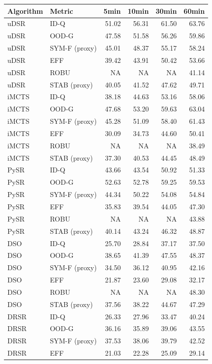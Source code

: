 \begin{tabular}{llrrrr}
\toprule
Algorithm & Metric & 5min & 10min & 30min & 60min \\
\midrule
uDSR & ID-Q & 51.02 & 56.31 & 61.50 & 63.76 \\
uDSR & OOD-G & 47.58 & 51.58 & 56.26 & 59.86 \\
uDSR & SYM-F (proxy) & 45.01 & 48.37 & 55.17 & 58.24 \\
uDSR & EFF & 39.42 & 43.91 & 50.42 & 53.66 \\
uDSR & ROBU & NA & NA & NA & 41.14 \\
uDSR & STAB (proxy) & 40.05 & 41.52 & 47.62 & 49.71 \\
iMCTS & ID-Q & 38.18 & 44.63 & 53.16 & 58.06 \\
iMCTS & OOD-G & 47.68 & 53.20 & 59.63 & 63.04 \\
iMCTS & SYM-F (proxy) & 45.28 & 51.09 & 58.40 & 61.43 \\
iMCTS & EFF & 30.09 & 34.73 & 44.60 & 50.41 \\
iMCTS & ROBU & NA & NA & NA & 38.49 \\
iMCTS & STAB (proxy) & 37.30 & 40.53 & 44.45 & 48.49 \\
PySR & ID-Q & 43.66 & 43.54 & 50.92 & 51.33 \\
PySR & OOD-G & 52.63 & 52.78 & 59.25 & 59.53 \\
PySR & SYM-F (proxy) & 44.34 & 50.22 & 54.08 & 54.84 \\
PySR & EFF & 35.83 & 39.54 & 44.05 & 47.30 \\
PySR & ROBU & NA & NA & NA & 43.88 \\
PySR & STAB (proxy) & 40.14 & 43.24 & 46.32 & 48.87 \\
DSO & ID-Q & 25.70 & 28.84 & 37.17 & 37.50 \\
DSO & OOD-G & 38.65 & 41.39 & 47.55 & 48.37 \\
DSO & SYM-F (proxy) & 34.50 & 36.12 & 40.95 & 42.16 \\
DSO & EFF & 21.87 & 23.60 & 29.08 & 32.17 \\
DSO & ROBU & NA & NA & NA & 48.30 \\
DSO & STAB (proxy) & 37.56 & 38.22 & 44.67 & 47.29 \\
DRSR & ID-Q & 26.33 & 27.96 & 33.47 & 40.24 \\
DRSR & OOD-G & 36.16 & 35.89 & 39.06 & 43.55 \\
DRSR & SYM-F (proxy) & 37.53 & 38.06 & 39.79 & 42.52 \\
DRSR & EFF & 21.03 & 22.28 & 25.09 & 29.14 \\

\end{tabular}
